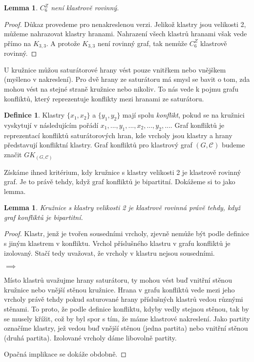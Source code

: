 \documentclass[12pt,a4report]{report}
\newtheorem{lemma}[theorem]{Lemma}
\theoremstyle{definition}
\newtheorem{defn}[theorem]{Definice}
\begin{document}
\begin{lemma}
\label{zak_minor}
$C_6^Z$ není klastrově rovinný.
\end{lemma}
\begin{proof}
Důkaz provedeme pro nenakreslenou verzi. Jelikož klastry jsou velikosti 2, můžeme nahrazovat klastry hranami. Nahrazení všech klastrů hranami však vede přímo na $K_{3,3}$. A protože $K_{3,3}$ není rovinný graf, tak nemůže $C_6^Z$ klastrově rovinný.
\end{proof}

U kružnice můžou saturátorové hrany vést pouze vnitřkem nebo vnějškem (myšleno v nakreslení). Pro dvě hrany ze saturátoru má smysl se bavit o tom, zda mohou vést na stejné straně kružnice nebo nikoliv. To nás vede k pojmu grafu konfliktů, který reprezentuje konflikty mezi hranami ze saturátoru. 

\begin{defn}
 Klastry $\{x_1, x_2\}$ a $\{y_1, y_2\}$ mají spolu \textit{konflikt}, pokud se na kružnici vyskytují v následujícím pořádí $x_1 , ..., y_1, ..., x_2, ..., y_2, ...$. Graf konfliktů je reprezentací konfliktů saturátorových hran, kde vrcholy jsou klastry a hrany představují konfliktní klastry. Graf konfliktů pro klastrový graf $(G,\mathcal C)$ budeme značit $GK_{(G,\mathcal C)}$
\end{defn}

Získáme ihned kritérium, kdy kružnice s klastry velikosti 2 je klastrově rovinný graf. Je to právě tehdy, když graf konfliktů je bipartitní. Dokážeme si to jako lemma.

\begin{lemma}\label{lemma_ekv_graf_konf_kl_rov}Kružnice s klastry velikosti 2 je klastrově rovinná právě tehdy, když graf konfliktů je bipartitní.
\end{lemma}
\begin{proof}
Klastr, jenž je tvořen sousedními vrcholy, zjevně nemůže být podle definice s jiným klastrem v konfliktu. Vrchol příslušného klastru v grafu konfliktů je izolovaný. Stačí tedy uvažovat, že vrcholy v klastru nejsou sousedními.

$\implies$

Místo klastrů uvažujme hrany saturátoru, ty mohou vést buď vnitřní stěnou kružnice nebo vnější stěnou kružnice. Hrana v grafu konfliktů vede mezi jeho vrcholy právě tehdy pokud saturované hrany příslušných klastrů vedou různými stěnami. To proto, že podle definice konfliktu, kdyby vedly stejnou stěnou, tak by se musely křížit, což by byl spor s tím, že máme klastrové nakreslení. Jako partity označíme klastry, jež vedou buď vnější stěnou (jedna partita) nebo vnitřní stěnou (druhá partita). Izolované vrcholy dáme libovolně partity.

Opačná implikace se dokáže obdobně.
\end{proof}
\end{document}
